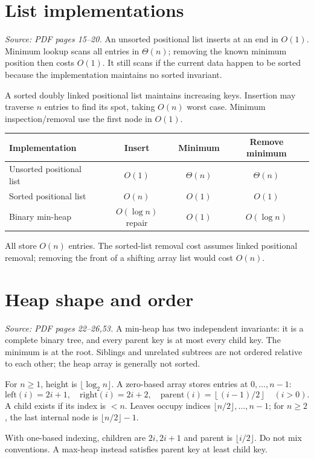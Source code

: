 \documentclass[11pt,letterpaper]{article}
\newcommand{\sourcepages}[1]{\textit{Source: PDF pages #1.}}
\begin{document}
\section{List implementations}
\sourcepages{15--20}
An unsorted positional list inserts at an end in $O(1)$. Minimum lookup scans all entries in $\Theta(n)$; removing the known minimum position then costs $O(1)$. It still scans if the current data happen to be sorted because the implementation maintains no sorted invariant.

A sorted doubly linked positional list maintains increasing keys. Insertion may traverse $n$ entries to find its spot, taking $O(n)$ worst case. Minimum inspection/removal use the first node in $O(1)$.
\begin{center}\begin{tabular}{@{}lccc@{}}\toprule
Implementation & Insert & Minimum & Remove minimum\\\midrule
Unsorted positional list & $O(1)$ & $\Theta(n)$ & $\Theta(n)$\\
Sorted positional list & $O(n)$ & $O(1)$ & $O(1)$\\
Binary min-heap & $O(\log n)$ repair & $O(1)$ & $O(\log n)$\\\bottomrule
\end{tabular}\end{center}
All store $O(n)$ entries. The sorted-list removal cost assumes linked positional removal; removing the front of a shifting array list would cost $O(n)$.

\section{Heap shape and order}
\sourcepages{22--26,53}
A min-heap has two independent invariants: it is a complete binary tree, and every parent key is at most every child key. The minimum is at the root. Siblings and unrelated subtrees are not ordered relative to each other; the heap array is generally not sorted.

For $n\geq1$, height is $\lfloor\log_2 n\rfloor$. A zero-based array stores entries at $0,\ldots,n-1$:
\[
\text{left}(i)=2i+1,\quad\text{right}(i)=2i+2,\quad
\text{parent}(i)=\left\lfloor(i-1)/2\right\rfloor\quad(i>0).
\]
A child exists if its index is $<n$. Leaves occupy indices $\lfloor n/2\rfloor,\ldots,n-1$; for $n\geq2$, the last internal node is $\lfloor n/2\rfloor-1$.

With one-based indexing, children are $2i,2i+1$ and parent is $\lfloor i/2\rfloor$. Do not mix conventions. A max-heap instead satisfies parent key at least child key.
\end{document}
